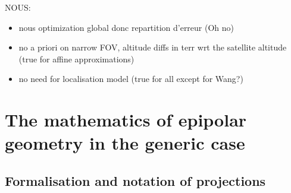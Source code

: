 \documentclass{ipol}
\begin{document}
 


 



NOUS: 
\begin{itemize}
\item nous optimization global donc repartition d'erreur (Oh no)
\item no a priori on narrow FOV, altitude diffs in terr wrt the satellite altitude (true for affine approximations) 
\item no need for localisation model (true for all except for Wang?)
\end{itemize}




\section{The mathematics of epipolar geometry in the generic case}

\subsection{Formalisation and notation of projections}
\end{document}
